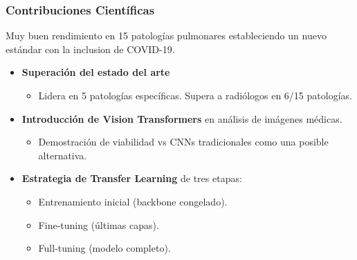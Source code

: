 
\begin{frame}
\frametitle{Contribuciones Científicas}
Muy buen rendimiento en 15 patologías pulmonares estableciendo un nuevo estándar con la inclusion de COVID-19.
\begin{itemize}
    \item \textbf{Superación del estado del arte}
    \begin{itemize}
        \item Lidera en 5 patologías específicas. Supera a radiólogos en 6/15 patologías.
    \end{itemize}
    \item \textbf{Introducción de Vision Transformers} en análisis de imágenes médicas.
    \begin{itemize}
        \item Demostración de viabilidad vs CNNs tradicionales como una posible alternativa.
    \end{itemize}
    \item \textbf{Estrategia de Transfer Learning} de tres etapas:
    \begin{itemize}
        \item Entrenamiento inicial (backbone congelado).
        \item Fine-tuning (últimas capas).
        \item Full-tuning (modelo completo).
    \end{itemize}
\end{itemize}
\end{frame}

